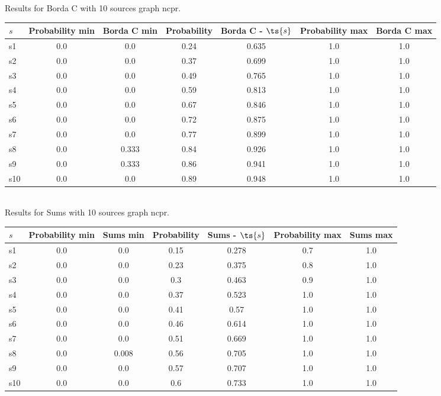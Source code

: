 \documentclass{article}
\begin{document}
\noindent Results for Borda C with 10 sources graph ncpr.

\noindent\begin{tabular}{|l|c|c|c|c|c|c|}
\hline
$s$& Probability min & Borda C min & Probability & Borda C - $\ts{s}$ & Probability max & Borda C max\\
\hline
s1 &0.0 & 0.0 & 0.24 & 0.635 & 1.0 & 1.0\\
\hline
s2 &0.0 & 0.0 & 0.37 & 0.699 & 1.0 & 1.0\\
\hline
s3 &0.0 & 0.0 & 0.49 & 0.765 & 1.0 & 1.0\\
\hline
s4 &0.0 & 0.0 & 0.59 & 0.813 & 1.0 & 1.0\\
\hline
s5 &0.0 & 0.0 & 0.67 & 0.846 & 1.0 & 1.0\\
\hline
s6 &0.0 & 0.0 & 0.72 & 0.875 & 1.0 & 1.0\\
\hline
s7 &0.0 & 0.0 & 0.77 & 0.899 & 1.0 & 1.0\\
\hline
s8 &0.0 & 0.333 & 0.84 & 0.926 & 1.0 & 1.0\\
\hline
s9 &0.0 & 0.333 & 0.86 & 0.941 & 1.0 & 1.0\\
\hline
s10 &0.0 & 0.0 & 0.89 & 0.948 & 1.0 & 1.0\\
\hline
\end{tabular}\\

\noindent Results for Sums with 10 sources graph ncpr.

\noindent\begin{tabular}{|l|c|c|c|c|c|c|}
\hline
$s$& Probability min & Sums min & Probability & Sums - $\ts{s}$ & Probability max & Sums max\\
\hline
s1 &0.0 & 0.0 & 0.15 & 0.278 & 0.7 & 1.0\\
\hline
s2 &0.0 & 0.0 & 0.23 & 0.375 & 0.8 & 1.0\\
\hline
s3 &0.0 & 0.0 & 0.3 & 0.463 & 0.9 & 1.0\\
\hline
s4 &0.0 & 0.0 & 0.37 & 0.523 & 1.0 & 1.0\\
\hline
s5 &0.0 & 0.0 & 0.41 & 0.57 & 1.0 & 1.0\\
\hline
s6 &0.0 & 0.0 & 0.46 & 0.614 & 1.0 & 1.0\\
\hline
s7 &0.0 & 0.0 & 0.51 & 0.669 & 1.0 & 1.0\\
\hline
s8 &0.0 & 0.008 & 0.56 & 0.705 & 1.0 & 1.0\\
\hline
s9 &0.0 & 0.0 & 0.57 & 0.707 & 1.0 & 1.0\\
\hline
s10 &0.0 & 0.0 & 0.6 & 0.733 & 1.0 & 1.0\\
\hline
\end{tabular}\\
\end{document}
